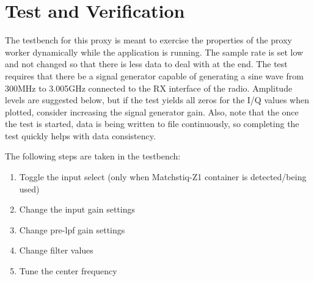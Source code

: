 \documentclass{article}
\begin{document}
\section*{Test and Verification}
The testbench for this proxy is meant to exercise the properties of the proxy worker dynamically while the application is running. The sample rate is set low and not changed so that there is less data to deal with at the end. The test requires that there be a signal generator capable of generating a sine wave from 300MHz to 3.005GHz connected to the RX interface of the radio. Amplitude levels are suggested below, but if the test yields all zeros for the I/Q values when plotted, consider increasing the signal generator gain. Also, note that the once the test is started, data is being written to file continuously, so completing the test quickly helps with data consistency.\par\medskip
\noindent The following steps are taken in the testbench:
\begin{enumerate}
	\item Toggle the input select (only when Matchstiq-Z1 container is detected/being used)
	\item Change the input gain settings
	\item Change pre-lpf gain settings
	\item Change filter values
	\item Tune the center frequency
\end{enumerate}
\newpage
\end{document}
